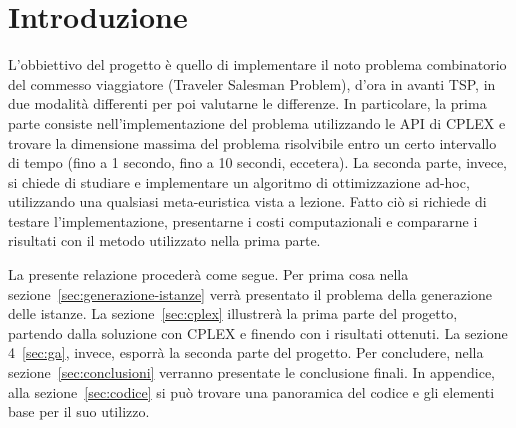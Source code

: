 
\section{Introduzione}\label{sec:introduzione}

L'obbiettivo del progetto è quello di implementare il noto problema combinatorio del commesso viaggiatore (Traveler Salesman Problem), d'ora in avanti TSP, in due modalità differenti
per poi valutarne le differenze.
In particolare, la prima parte consiste nell'implementazione del problema utilizzando le API di CPLEX e trovare la dimensione massima del problema risolvibile entro un certo intervallo
di tempo (fino a 1 secondo, fino a 10 secondi, eccetera).
La seconda parte, invece, si chiede di studiare e implementare un algoritmo di ottimizzazione ad-hoc, utilizzando una qualsiasi meta-euristica vista a lezione.
Fatto ciò si richiede di testare l'implementazione, presentarne i costi computazionali e compararne i risultati con il metodo utilizzato nella prima parte.

La presente relazione procederà come segue.
Per prima cosa nella sezione~\ref{sec:generazione-istanze} verrà presentato il problema della generazione delle istanze.
La sezione~\ref{sec:cplex} illustrerà la prima parte del progetto, partendo dalla soluzione con CPLEX e finendo con i risultati ottenuti.
La sezione 4~\ref{sec:ga}, invece, esporrà la seconda parte del progetto.
Per concludere, nella sezione~\ref{sec:conclusioni} verranno presentate le conclusione finali.
In appendice, alla sezione~\ref{sec:codice} si può trovare una panoramica del codice e gli elementi base per il suo utilizzo.
